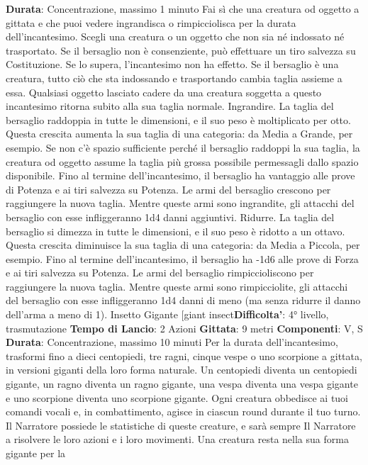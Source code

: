 \begin{multicols}{2}
\textbf{Durata}: Concentrazione, massimo 1 minuto
Fai sì che una creatura od oggetto a gittata e che puoi
vedere ingrandisca o rimpicciolisca per la durata
dell’incantesimo. Scegli una creatura o un oggetto che
non sia né indossato né trasportato. Se il bersaglio non
è consenziente, può effettuare un tiro salvezza su
Costituzione. Se lo supera, l’incantesimo non ha effetto.
Se il bersaglio è una creatura, tutto ciò che sta
indossando e trasportando cambia taglia assieme a
essa. Qualsiasi oggetto lasciato cadere da una creatura
soggetta a questo incantesimo ritorna subito alla sua
taglia normale.
Ingrandire. La taglia del bersaglio raddoppia in tutte le
dimensioni, e il suo peso è moltiplicato per otto. Questa
crescita aumenta la sua taglia di una categoria: da
Media a Grande, per esempio. Se non c’è spazio
sufficiente perché il bersaglio raddoppi la sua taglia, la
creatura od oggetto assume la taglia più grossa
possibile permessagli dallo spazio disponibile. Fino al
termine dell’incantesimo, il bersaglio ha vantaggio alle
prove di Potenza e ai tiri salvezza su Potenza. Le armi del
bersaglio crescono per raggiungere la nuova taglia.
Mentre queste armi sono ingrandite, gli attacchi del
bersaglio con esse infliggeranno 1d4 danni aggiuntivi.
Ridurre. La taglia del bersaglio si dimezza in tutte le
dimensioni, e il suo peso è ridotto a un ottavo. Questa
crescita diminuisce la sua taglia di una categoria: da
Media a Piccola, per esempio. Fino al termine
dell’incantesimo, il bersaglio ha -1d6 alle prove di
Forza e ai tiri salvezza su Potenza. Le armi del bersaglio
rimpiccioliscono per raggiungere la nuova taglia. Mentre
queste armi sono rimpicciolite, gli attacchi del bersaglio
con esse infliggeranno 1d4 danni di meno (ma senza
ridurre il danno dell’arma a meno di 1).
Insetto Gigante
[giant insect\textbf{Difficolta'}:
4° livello, trasmutazione
\textbf{Tempo di Lancio}: 2 Azioni
\textbf{Gittata}: 9 metri
\textbf{Componenti}: V, S
\textbf{Durata}: Concentrazione, massimo 10 minuti
Per la durata dell’incantesimo, trasformi fino a dieci
centopiedi, tre ragni, cinque vespe o uno scorpione a
gittata, in versioni giganti della loro forma naturale. Un
centopiedi diventa un centopiedi gigante, un ragno
diventa un ragno gigante, una vespa diventa una vespa
gigante e uno scorpione diventa uno scorpione gigante.
Ogni creatura obbedisce ai tuoi comandi vocali e, in
combattimento, agisce in ciascun round durante il tuo
turno. Il Narratore possiede le statistiche di queste creature, e
sarà sempre Il Narratore a risolvere le loro azioni e i loro
movimenti.
Una creatura resta nella sua forma gigante per la

\end{multicols}
